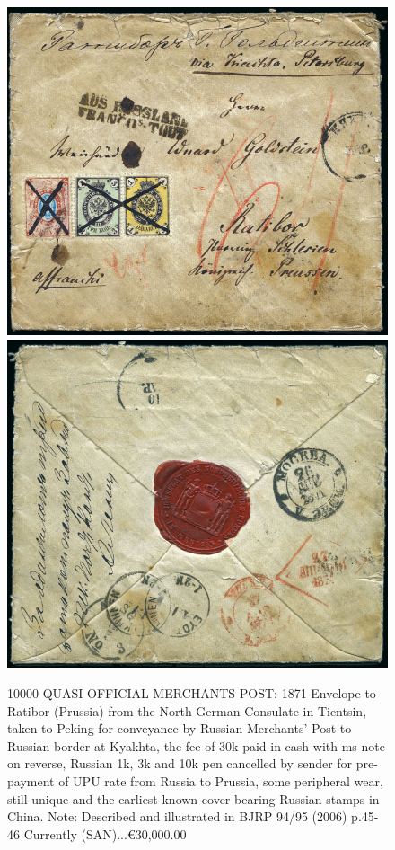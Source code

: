\begin{figure}[htbp]
\includegraphics[width=.98\textwidth]{../russian-post-offices-in-china/10000.jpg}
\includegraphics[width=.98\textwidth]{../russian-post-offices-in-china/10000-1.jpg}
\caption{
10000  QUASI OFFICIAL MERCHANTS POST: 1871 Envelope to Ratibor (Prussia)
from the North German Consulate in Tientsin, taken to Peking for conveyance
by Russian Merchants' Post to Russian border at Kyakhta, the fee of 30k paid
in cash with ms note on reverse, Russian 1k, 3k and 10k pen cancelled by
sender for pre-payment of UPU rate from Russia to Prussia, some peripheral
wear, still unique and the earliest known cover bearing Russian stamps in China.
Note: Described and illustrated in BJRP 94/95 (2006) p.45-46
Currently (SAN)...\euro 30,000.00
}  

\end{figure}


